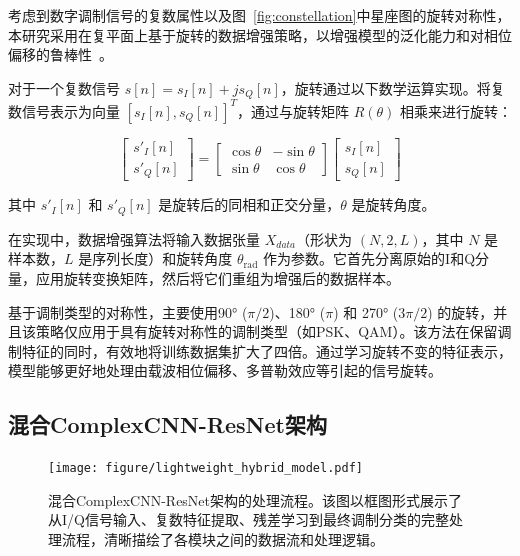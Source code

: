 \documentclass[conference]{IEEEtran}
\begin{document}
考虑到数字调制信号的复数属性以及图~\ref{fig:constellation}中星座图的旋转对称性，本研究采用在复平面上基于旋转的数据增强策略，以增强模型的泛化能力和对相位偏移的鲁棒性~\cite{guo2024ulcnn}。

对于一个复数信号 \(s[n] = s_I[n] + j s_Q[n]\)，旋转通过以下数学运算实现。将复数信号表示为向量 \([s_I[n], s_Q[n]]^T\)，通过与旋转矩阵 \(R(\theta)\) 相乘来进行旋转：

\begin{equation}
\begin{bmatrix} s'_I[n] \\ s'_Q[n] \end{bmatrix} = \begin{bmatrix} \cos\theta & -\sin\theta \\ \sin\theta & \cos\theta \end{bmatrix} \begin{bmatrix} s_I[n] \\ s_Q[n] \end{bmatrix}
\end{equation}

其中 \(s'_I[n]\) 和 \(s'_Q[n]\) 是旋转后的同相和正交分量，\(\theta\) 是旋转角度。



在实现中，数据增强算法将输入数据张量 \(X_{data}\)（形状为 \((N, 2, L)\)，其中 \(N\) 是样本数，\(L\) 是序列长度）和旋转角度 \(\theta_{\text{rad}}\) 作为参数。它首先分离原始的I和Q分量，应用旋转变换矩阵，然后将它们重组为增强后的数据样本。

基于调制类型的对称性，主要使用90° (\(\pi/2\))、180° (\(\pi\)) 和 270° (\(3\pi/2\)) 的旋转，并且该策略仅应用于具有旋转对称性的调制类型（如PSK、QAM）。该方法在保留调制特征的同时，有效地将训练数据集扩大了四倍。通过学习旋转不变的特征表示，模型能够更好地处理由载波相位偏移、多普勒效应等引起的信号旋转。


\subsection{混合ComplexCNN-ResNet架构}

\begin{figure}[htbp]
\centering
\texttt{[image: figure/lightweight\_hybrid\_model.pdf]}
\caption{混合ComplexCNN-ResNet架构的处理流程。该图以框图形式展示了从I/Q信号输入、复数特征提取、残差学习到最终调制分类的完整处理流程，清晰描绘了各模块之间的数据流和处理逻辑。}
\label{fig:lightweight_hybrid_model_flow}
\end{figure}
\end{document}
